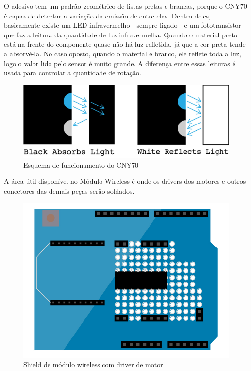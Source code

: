 \documentclass[paper=a4, fontsize=11pt]{scrartcl} %
\numberwithin{equation}{section} %
\numberwithin{figure}{section} %
\numberwithin{table}{section} %
\begin{document}
O adesivo tem um padrão geométrico de listas pretas e brancas, porque o CNY70 é capaz de detectar a variação da emissão de entre elas. Dentro deles, basicamente existe um LED infravermelho - sempre ligado - e um fototransistor que faz a leitura da quantidade de luz infravermelha. Quando o material preto está na frente do componente quase não há luz refletida, já que a cor preta tende a absorvê-la. No caso oposto, quando o material é branco, ele reflete toda a luz, logo o valor lido pelo sensor é muito grande. A diferença entre essas leituras é usada para controlar a quantidade de rotação.

\begin{figure}[h] %
  \centering
  \includegraphics[scale=0.10]{./imagens/cny70-physycs.jpg}
  \caption[ ]{Esquema de funcionamento do CNY70 }
  \label{fig:cny70}
\end{figure}

A área útil disponível no Módulo Wireless é onde os drivers dos motores e outros conectores das demais peças serão soldados. 

\begin{figure}[h] %
  \centering
  \includegraphics[scale=0.13]{./imagens/wireless-shield-connections.jpg}
  \caption[ ]{Shield de módulo wireless com driver de motor }
  \label{fig:esquema shield}
\end{figure}
\end{document}
